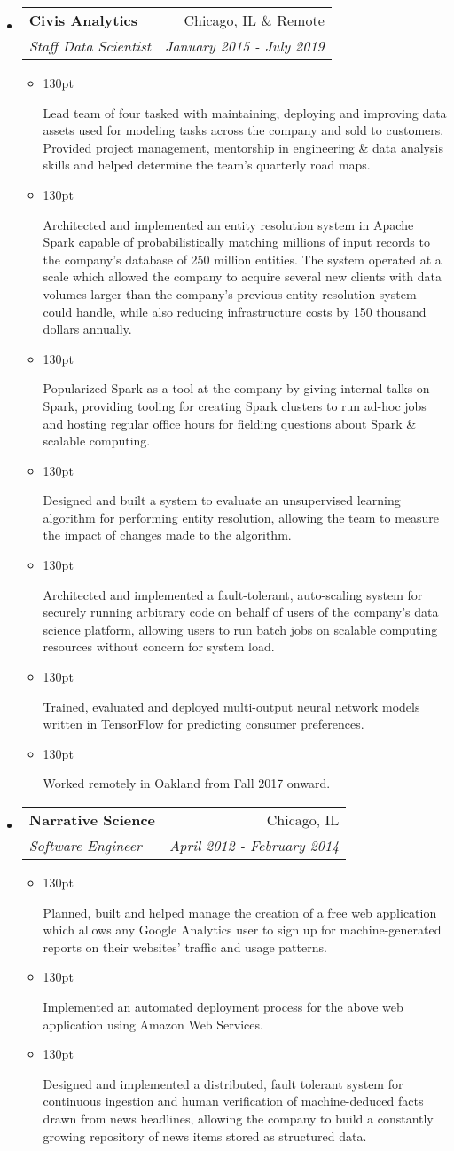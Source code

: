 \documentclass[letterpaper,10pt]{article}
\makeatletter
\newcommand{\resumeItem}[1]{
  \item{
    \begin{adjustwidth}{}{130pt}
    #1
    \end{adjustwidth}
  }
}
\newcommand{\resumeSubheading}[4]{
  \vspace{-1pt}\item[]
    \begin{tabular*}{0.97\textwidth}{l@{\extracolsep{\fill}}r}
      \textbf{#1} & #2 \\
      \textit{#3} & \textit{#4} \\
    \end{tabular*}\vspace{-5pt}
}
\makeatother
\begin{document}
\begin{itemize}[leftmargin=*]
    \resumeSubheading
      {Civis Analytics}
      {Chicago, IL \& Remote}
      {Staff Data Scientist}
      {January 2015 - July 2019}
    \begin{itemize}
      \resumeItem{
        Lead team of four tasked with maintaining, deploying and
        improving data assets used for modeling tasks across the
        company and sold to customers. Provided project management,
        mentorship in engineering \& data analysis skills and helped
        determine the team's quarterly road maps.
      }
      \resumeItem{
        Architected and implemented an entity resolution
        system in Apache Spark capable of probabilistically
        matching millions of input records to the company's
        database of 250 million entities.
        The system operated at a scale which allowed the company
        to acquire several new clients with data volumes larger
        than the company's previous entity resolution system could
        handle, while also reducing infrastructure costs by 150
        thousand dollars annually.
      }
      \resumeItem{
        Popularized Spark as a tool at the company by giving
        internal talks on Spark, providing tooling for creating
        Spark clusters to run ad-hoc jobs and hosting regular
        office hours for fielding questions about Spark \&
        scalable computing.
      }
      \resumeItem{
        Designed and built a system to evaluate an unsupervised
        learning algorithm for performing entity resolution,
        allowing the team to measure the impact of changes made to
        the algorithm.
      }
      \resumeItem{
        Architected and implemented a fault-tolerant,
        auto-scaling system for securely running arbitrary code on
        behalf of users of the company's data science platform,
        allowing users to run batch jobs on scalable computing
        resources without concern for system load.
      }
      \resumeItem{
        Trained, evaluated and deployed multi-output neural
        network models written in TensorFlow for predicting
        consumer preferences.
      }
      \resumeItem{
        Worked remotely in Oakland from Fall 2017 onward.
      }
    \end{itemize}

    \resumeSubheading
      {Narrative Science}
      {Chicago, IL}
      {Software Engineer}
      {April 2012 - February 2014}
    \begin{itemize}
      \resumeItem{
        Planned, built and helped manage the creation of a
        free web application which allows any Google Analytics
        user to sign up for machine-generated reports on their
        websites' traffic and usage patterns.
      }
      \resumeItem{
        Implemented an automated deployment process for the
        above web application using Amazon Web Services.
      }
      \resumeItem{
        Designed and implemented a distributed, fault tolerant
        system for continuous ingestion and human verification of
        machine-deduced facts drawn from news headlines, allowing
        the company to build a constantly growing repository of news
        items stored as structured data.
      }
    \end{itemize}


\end{itemize}
\end{document}

